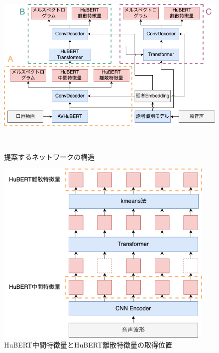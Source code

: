 \documentclass[12pt]{jarticle}
\numberwithin{equation}{section}    %
\numberwithin{figure}{section}      %
\numberwithin{table}{section}      %
\begin{document}
\begin{figure}[bt]
    \centering
    \includegraphics[height=90mm]{./figure/sec4/model/network.png}
    \caption{提案するネットワークの構造}
    \label{sec4:fig:network}
\end{figure}

\begin{figure}[bt]
    \centering
    \includegraphics[height=90mm]{./figure/sec4/model/hubert.png}
    \caption{HuBERT中間特徴量とHuBERT離散特徴量の取得位置}
    \label{sec4:fig:hubert}
\end{figure}
\end{document}
